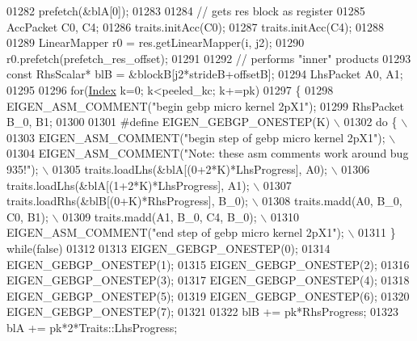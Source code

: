 \begin{DoxyCode}
01282           prefetch(&blA[0]);
01283 
01284           \textcolor{comment}{// gets res block as register}
01285           AccPacket C0, C4;
01286           traits.initAcc(C0);
01287           traits.initAcc(C4);
01288 
01289           LinearMapper r0 = res.getLinearMapper(i, j2);
01290           r0.prefetch(prefetch\_res\_offset);
01291 
01292           \textcolor{comment}{// performs "inner" products}
01293           \textcolor{keyword}{const} RhsScalar* blB = &blockB[j2*strideB+offsetB];
01294           LhsPacket A0, A1;
01295 
01296           \textcolor{keywordflow}{for}(\hyperlink{namespace_eigen_a62e77e0933482dafde8fe197d9a2cfde}{Index} k=0; k<peeled\_kc; k+=pk)
01297           \{
01298             EIGEN\_ASM\_COMMENT(\textcolor{stringliteral}{"begin gebp micro kernel 2pX1"});
01299             RhsPacket B\_0, B1;
01300         
01301 \textcolor{preprocessor}{#define EIGEN\_GEBGP\_ONESTEP(K) \(\backslash\)}
01302 \textcolor{preprocessor}{            do \{                                                                  \(\backslash\)}
01303 \textcolor{preprocessor}{              EIGEN\_ASM\_COMMENT("begin step of gebp micro kernel 2pX1");          \(\backslash\)}
01304 \textcolor{preprocessor}{              EIGEN\_ASM\_COMMENT("Note: these asm comments work around bug 935!"); \(\backslash\)}
01305 \textcolor{preprocessor}{              traits.loadLhs(&blA[(0+2*K)*LhsProgress], A0);                      \(\backslash\)}
01306 \textcolor{preprocessor}{              traits.loadLhs(&blA[(1+2*K)*LhsProgress], A1);                      \(\backslash\)}
01307 \textcolor{preprocessor}{              traits.loadRhs(&blB[(0+K)*RhsProgress], B\_0);                       \(\backslash\)}
01308 \textcolor{preprocessor}{              traits.madd(A0, B\_0, C0, B1);                                       \(\backslash\)}
01309 \textcolor{preprocessor}{              traits.madd(A1, B\_0, C4, B\_0);                                      \(\backslash\)}
01310 \textcolor{preprocessor}{              EIGEN\_ASM\_COMMENT("end step of gebp micro kernel 2pX1");            \(\backslash\)}
01311 \textcolor{preprocessor}{            \} while(false)}
01312         
01313             EIGEN\_GEBGP\_ONESTEP(0);
01314             EIGEN\_GEBGP\_ONESTEP(1);
01315             EIGEN\_GEBGP\_ONESTEP(2);
01316             EIGEN\_GEBGP\_ONESTEP(3);
01317             EIGEN\_GEBGP\_ONESTEP(4);
01318             EIGEN\_GEBGP\_ONESTEP(5);
01319             EIGEN\_GEBGP\_ONESTEP(6);
01320             EIGEN\_GEBGP\_ONESTEP(7);
01321 
01322             blB += pk*RhsProgress;
01323             blA += pk*2*Traits::LhsProgress;

\end{DoxyCode}
